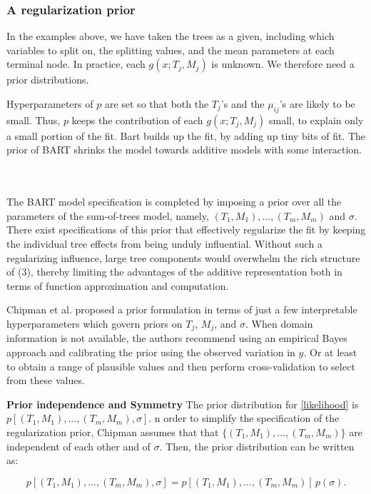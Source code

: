 \documentclass[a4paper,11pt]{article}
\begin{document}
\subsubsection{A regularization prior}
In the examples above, we have taken the trees as a given, including which variables to split on, the splitting values, and the mean parameters at each terminal node. In practice, each \( g(x; T_j, M_j) \) is unknown. We therefore need a prior distributions. 

Hyperparameters of $p$ are set so that both the \(T_j\)'s and the 
\(\mu_{ij}\)'s are likely to be small. Thus, $p$ keeps the contribution of each \(g(x; T_j, M_j)\) small, to 
explain only a small portion of the fit. Bart builds up the fit, by adding up tiny bits of fit.  The prior of BART shrinks the model towards additive models with some interaction.

\\\\The BART model specification is completed by imposing a prior over all the parameters of the sum-of-trees model, namely, \( (T_1, M_1), \ldots, (T_m, M_m) \) and \( \sigma \). There exist specifications of this prior that effectively regularize the fit by keeping the individual tree effects from being unduly influential. Without such a regularizing influence, large tree components would overwhelm the rich structure of (3), thereby limiting the advantages of the additive representation both in terms of function approximation and computation.

Chipman et al. proposed a prior formulation in terms of just a few interpretable hyperparameters which govern priors on \( T_j \), \( M_j \), and \( \sigma \). When domain information is not available, the authors recommend using an empirical Bayes approach and calibrating the prior using the observed variation in \( y \). Or at least to obtain a range of plausible values and then perform cross-validation to select from these values.

\textbf{Prior independence and Symmetry}
The prior distribution for \eqref{likelihood} is \( p[(T_1, M_1), \ldots, (T_m, M_m), \sigma] \). n order to simplify the specification of the regularization prior, Chipman assumes that  that \( \{(T_1, M_1), \ldots, (T_m, M_m)\} \) are independent of each other and of  \( \sigma \). Then, the prior distribution can be written as:

\[
p[(T_1, M_1), \ldots, (T_m, M_m), \sigma] = p[(T_1, M_1), \ldots, (T_m, M_m)] \, p(\sigma).
\]
\end{document}
